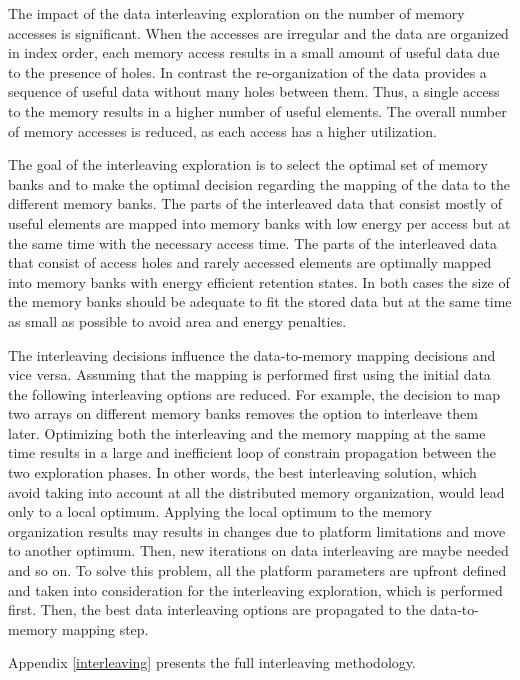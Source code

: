 The impact of the data interleaving exploration on the number of memory accesses is significant.
When the accesses are irregular and the data are organized in index order, each memory access results in a small amount of useful data due to the presence of holes.
In contrast the re-organization of the data provides a sequence of useful data without many holes between them.
Thus, a single access to the memory results in a higher number of useful elements.
The overall number of memory accesses is reduced, as each access has a higher utilization.

The goal of the interleaving exploration is to select the optimal set of memory banks and to make  the optimal decision regarding the mapping of the data to the different memory banks.
The parts of the interleaved data that consist mostly of useful elements are mapped into memory banks with low energy per access but at the same time with the necessary access time.
The parts of the interleaved data that consist of access holes and rarely accessed elements are optimally mapped into memory banks with energy efficient retention states.
In both cases the size of  the memory banks should be adequate to fit the stored data but at the same time as small as possible to avoid area and energy penalties.

The interleaving decisions influence the data-to-memory mapping decisions and vice versa.
Assuming that the mapping is performed first using the initial data the following interleaving options are reduced.
For example, the decision to map two arrays on different memory banks removes the option to interleave them later.
Optimizing both the interleaving and the memory mapping at the same time results in a large and inefficient loop of constrain propagation between the two exploration phases.
In other words, the best interleaving solution, which avoid taking into account at all the distributed memory organization, would lead only to a local optimum.
Applying the local optimum to the memory organization results may results in changes due to platform limitations and move to another optimum.
Then, new iterations on data interleaving are maybe needed and so on.
To solve this problem, all the platform parameters are upfront defined and taken into consideration for the interleaving exploration, which is performed first.
Then, the best data interleaving options are propagated to the data-to-memory mapping step.

Appendix \ref{interleaving} presents the full interleaving methodology.

